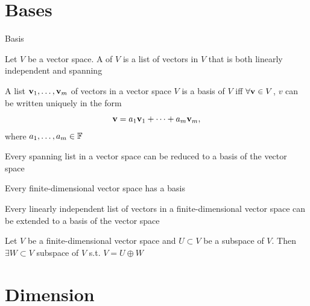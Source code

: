 \documentclass[aspectratio=169]{beamer}
\begin{document}
\section{Bases}

\begin{frame}{Basis}
\begin{definition}[Basis]
Let $V$ be a vector space. A  of $V$ is a list of vectors in $V$ that is both linearly independent and spanning
\end{definition}

\begin{theorem}
A list $\mathbf{v}_1,\ldots,\mathbf{v}_m$ of vectors in a vector space $V$ is a basis of $V$ iff $\forall \mathbf{v}\in V$, $v$ can be written uniquely in the form
\[
\mathbf{v}=a_1\mathbf{v}_1+\cdots+a_m\mathbf{v}_m,
\]
where $a_1,\ldots,a_m\in\mathbb{F}$
\end{theorem}
\end{frame}

\begin{frame}
\begin{importanttheorem}
Every spanning list in a vector space can be reduced to a basis of the vector space
\end{importanttheorem}

\begin{importanttheorem}
Every finite-dimensional vector space has a basis
\end{importanttheorem}

\begin{importanttheorem}
Every linearly independent list of vectors in a finite-dimensional vector space can be extended to a basis of the vector space
\end{importanttheorem}

\begin{theorem}
Let $V$ be a finite-dimensional vector space and $U\subset V$ be a subspace of $V$. Then $\exists W\subset V$ subspace of $V$ s.t. $V=U\oplus W$
\end{theorem}
\end{frame}


\section{Dimension}
\end{document}
